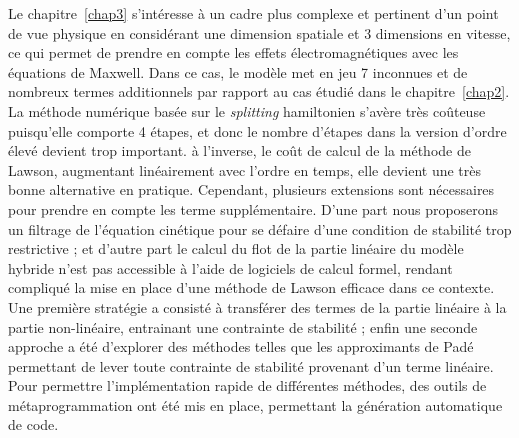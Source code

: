 Le chapitre~\ref{chap3} s'intéresse à un cadre plus complexe et pertinent d'un point de vue physique en considérant une dimension spatiale et 3 dimensions en vitesse, ce qui permet de prendre en compte les effets électromagnétiques avec les équations de Maxwell. Dans ce cas, le modèle met en jeu 7 inconnues et de nombreux termes additionnels par rapport au cas étudié dans le chapitre~\ref{chap2}. La méthode numérique basée sur le \emph{splitting} hamiltonien s'avère très coûteuse puisqu'elle comporte 4 étapes, et donc le nombre d'étapes dans la version d'ordre élevé devient trop important. à l'inverse, le coût de calcul de la méthode de Lawson, augmentant linéairement avec l'ordre en temps, elle devient une très bonne alternative en pratique. Cependant, plusieurs extensions sont nécessaires pour prendre en compte les terme supplémentaire. D'une part nous proposerons un filtrage de l'équation cinétique pour se défaire d'une condition de stabilité trop restrictive ; et d'autre part le calcul du flot de la partie linéaire du modèle hybride n'est pas accessible à l'aide de logiciels de calcul formel, rendant compliqué la mise en place d'une méthode de Lawson efficace dans ce contexte. Une première stratégie a consisté à transférer des termes de la partie linéaire à la partie non-linéaire, entrainant une contrainte de stabilité ; enfin une seconde approche a été d'explorer des méthodes telles que les approximants de Padé permettant de lever toute contrainte de stabilité provenant d'un terme linéaire. Pour permettre l'implémentation rapide de différentes méthodes, des outils de métaprogrammation ont été mis en place, permettant la génération automatique de code.
